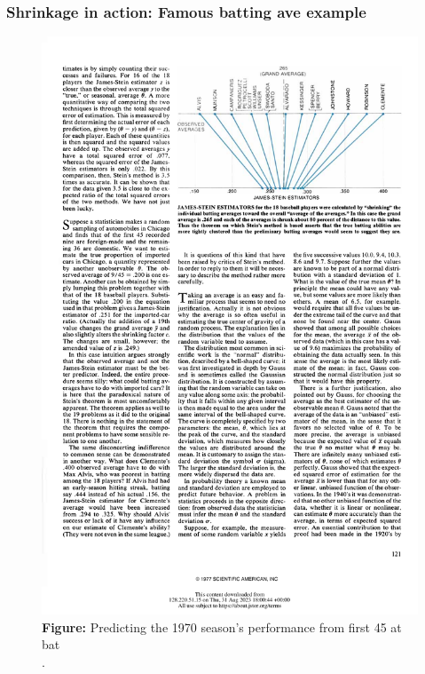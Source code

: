 \documentclass[18pt, handout]{beamer}
\begin{document}
\begin{frame}
\frametitle{Shrinkage in action: Famous batting ave example}
\begin{figure}
\centering
\includegraphics[width=.75\linewidth]{Figure/batting_ave_example_scientific_american}
\caption*{\textcolor{themecolor}{\textbf{Figure:}}
	Predicting the 1970 season's performance from first 45 at bat\\ \hfill \citep{efron1977stein_sci_american}.%
}%
\end{figure}
\end{frame}
\end{document}

